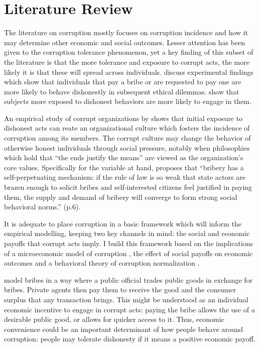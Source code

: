 \documentclass[12pt,a4]{article}\usepackage[]{graphicx}\usepackage[]{xcolor}
\begin{document}




\section{Literature Review}

The literature on corruption mostly focuses on corruption incidence and how it may determine other economic and social outcomes. Lesser attention has been given to the corruption tolerance phenomenon, yet a key finding of this subset of the literature is that the more tolerance and exposure to corrupt acts, the more likely it is that these will spread across individuals. \textcite{Ariely.2019} discuss experimental findings which show that individuals that pay a bribe or are requested to pay one are more likely to behave dishonestly in subsequent ethical dilemmas. \textcite{Gino.2009} show that subjects more exposed to dishonest behaviors are more likely to engage in them. 

An empirical study of corrupt organizations by \textcite{Campbell.2014} shows that initial exposure to dishonest acts can reate an organizational culture which fosters the incidence of corruption among its members. The corrupt culture may change the behavior of otherwise honest individuals through social pressure, notably when philosophies which hold that \enquote{the ends justify the means} are viewed as the organization's core values. Specifically for the variable at hand, \textcite{Carlin.2013} proposes that \enquote{bribery has a self-perpetuating mechanism: if the rule of law is so weak that state actors are brazen enough to solicit bribes and self-interested citizens feel justified in paying them, the supply and demand of bribery will converge to form strong social behavioral norms.} (p.6). 

It is adequate to place corruption in a basic framework which will inform the empirical modelling, keeping two key channels in mind: the social and economic payoffs that corrupt acts imply. I build this framework based on the implications of a microeconomic model of corruption \parencite{Shleifer.1993}, the effect of social payoffs on economic outcomes \parencite{Akerlof.1980} and a behavioral theory of corruption normalization \parencite{Ashforth.2003}.

\textcite{Shleifer.1993} model bribes in a way where a public official trades public goods in exchange for bribes. Private agents then pay them to receive the good and the consumer surplus that any transaction brings. This might be understood as an individual economic incentive to engage in corrupt acts: paying the bribe allows the use of a desirable public good, or allows for quicker access to it. Thus, economic convenience could be an important determinant of how people behave around corruption: people may tolerate dishonesty if it means a positive economic payoff. 
\end{document}
